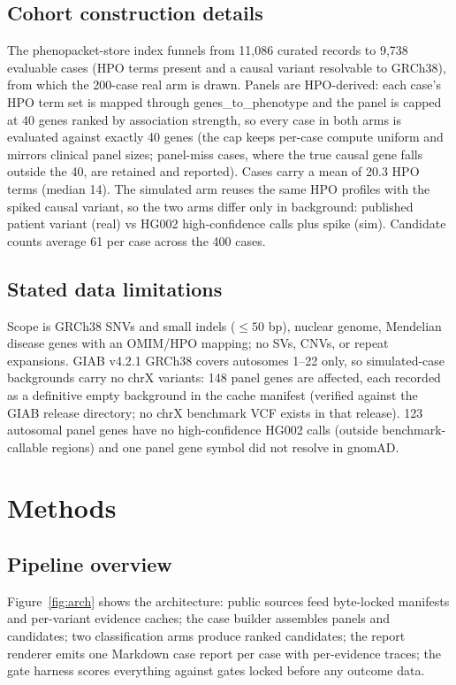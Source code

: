 \documentclass[11pt]{article}
\begin{document}
\subsection{Cohort construction details}
The phenopacket-store index funnels from 11,086 curated records to 9,738 evaluable
cases (HPO terms present and a causal variant resolvable to GRCh38), from which the
200-case real arm is drawn. Panels are HPO-derived: each case's HPO term set is
mapped through genes\_to\_phenotype and the panel is capped at 40 genes ranked by
association strength, so every case in both arms is evaluated against exactly 40
genes (the cap keeps per-case compute uniform and mirrors clinical panel sizes;
panel-miss cases, where the true causal gene falls outside the 40, are retained and
reported). Cases carry a mean of 20.3 HPO terms (median 14). The simulated arm
reuses the same HPO profiles with the spiked causal variant, so the two arms differ
only in background: published patient variant (real) vs HG002 high-confidence calls
plus spike (sim). Candidate counts average 61 per case across the 400 cases.

\subsection{Stated data limitations}
Scope is GRCh38 SNVs and small indels ($\leq 50$ bp), nuclear genome, Mendelian
disease genes with an OMIM/HPO mapping; no SVs, CNVs, or repeat expansions. GIAB
v4.2.1 GRCh38 covers autosomes 1--22 only, so simulated-case backgrounds carry no
chrX variants: 148 panel genes are affected, each recorded as a definitive empty
background in the cache manifest (verified against the GIAB release directory; no
chrX benchmark VCF exists in that release). 123 autosomal panel genes have no
high-confidence HG002 calls (outside benchmark-callable regions) and one panel gene
symbol did not resolve in gnomAD.

\section{Methods}
\subsection{Pipeline overview}
Figure~\ref{fig:arch} shows the architecture: public sources feed byte-locked
manifests and per-variant evidence caches; the case builder assembles panels and
candidates; two classification arms produce ranked candidates; the report renderer
emits one Markdown case report per case with per-evidence traces; the gate harness
scores everything against gates locked before any outcome data.
\end{document}
